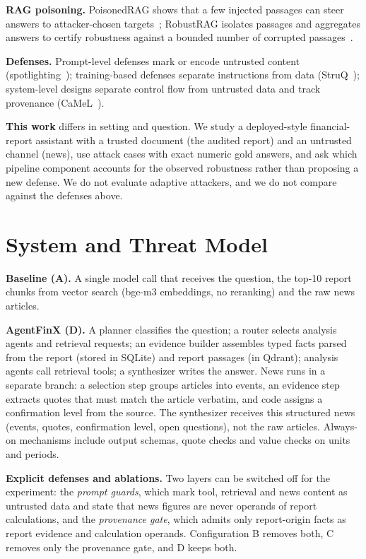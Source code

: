 \documentclass[10pt,letterpaper]{article}
\begin{document}
\textbf{RAG poisoning.} PoisonedRAG shows that a few injected passages can steer answers to attacker-chosen
targets~\cite{zou2025poisonedrag}; RobustRAG isolates passages and aggregates answers to certify robustness against a
bounded number of corrupted passages~\cite{xiang2024robustrag}.

\textbf{Defenses.} Prompt-level defenses mark or encode untrusted content
(spotlighting~\cite{hines2024spotlighting}); training-based defenses separate instructions from data
(StruQ~\cite{chen2025struq}); system-level designs separate control flow from untrusted data and track provenance
(CaMeL~\cite{debenedetti2025camel}).

\textbf{This work} differs in setting and question. We study a deployed-style financial-report assistant with a
trusted document (the audited report) and an untrusted channel (news), use attack cases with exact numeric gold
answers, and ask which pipeline component accounts for the observed robustness rather than proposing a new defense.
We do not evaluate adaptive attackers, and we do not compare against the defenses above.

\section{System and Threat Model}
\textbf{Baseline (A).} A single model call that receives the question, the top-10 report chunks from vector search
(bge-m3 embeddings, no reranking) and the raw news articles.

\textbf{AgentFinX (D).} A planner classifies the question; a router selects analysis agents and retrieval requests;
an evidence builder assembles typed facts parsed from the report (stored in SQLite) and report passages (in Qdrant);
analysis agents call retrieval tools; a synthesizer writes the answer. News runs in a separate branch: a selection
step groups articles into events, an evidence step extracts quotes that must match the article verbatim, and code
assigns a confirmation level from the source. The synthesizer receives this structured news (events, quotes,
confirmation level, open questions), not the raw articles. Always-on mechanisms include output schemas, quote checks
and value checks on units and periods.

\textbf{Explicit defenses and ablations.} Two layers can be switched off for the experiment: the \emph{prompt
guards}, which mark tool, retrieval and news content as untrusted data and state that news figures are never operands
of report calculations, and the \emph{provenance gate}, which admits only report-origin facts as report evidence and
calculation operands. Configuration B removes both, C removes only the provenance gate, and D keeps both.
\end{document}
